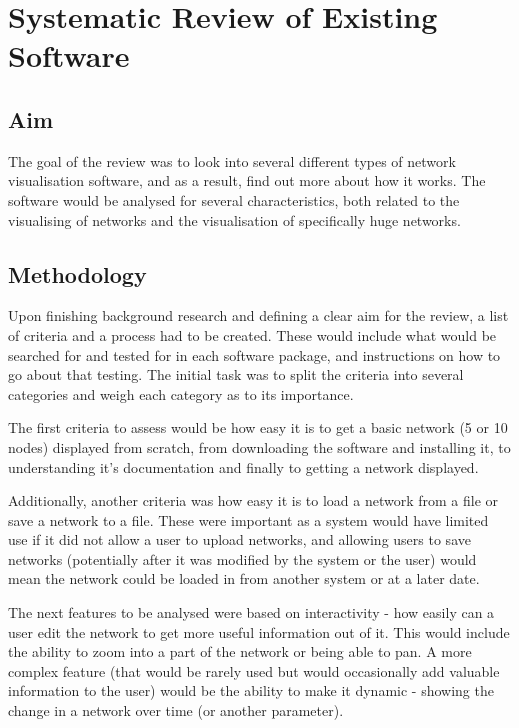 \documentclass[../dissertation.tex]{subfiles}
\begin{document}
\chapter{Systematic Review of Existing Software}
\label{sec:systematic-review}

\section{Aim} 

The goal of the review was to look into several different types of network visualisation software, and as a result, find out more about how it works. The software would be analysed for several characteristics, both related to the visualising of networks and the visualisation of specifically huge networks.

\section{Methodology}

Upon finishing background research and defining a clear aim for the review, a list of criteria and a process had to be created. These would include what would be searched for and tested for in each software package, and instructions on how to go about that testing. The initial task was to split the criteria into several categories and weigh each category as to its importance. 

The first criteria to assess would be how easy it is to get a basic network (5 or 10 nodes) displayed from scratch, from downloading the software and installing it, to understanding it's documentation and finally to getting a network displayed.

Additionally, another criteria was how easy it is to load a network from a file or save a network to a file. These were important as a system would have limited use if it did not allow a user to upload networks, and allowing users to save networks (potentially after it was modified by the system or the user) would mean the network could be loaded in from another system or at a later date. 

The next features to be analysed were based on interactivity - how easily can a user edit the network to get more useful information out of it. This would include the ability to zoom into a part of the network or being able to pan. A more complex feature (that would be rarely used but would occasionally add valuable information to the user) would be the ability to make it dynamic - showing the change in a network over time (or another parameter). 
\end{document}
